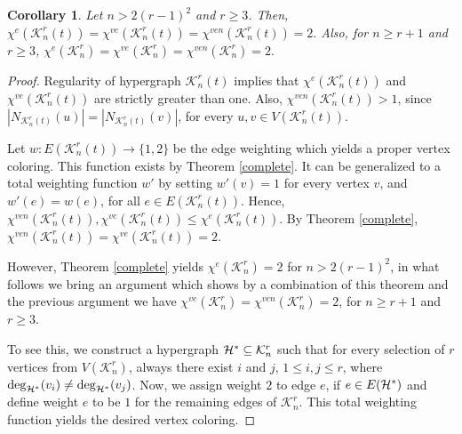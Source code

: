 \documentclass[12pt,a4paper]{article}
\newtheorem{cor}[theorem]{\bf Corollary}
\begin{document}
\begin{cor}
	Let $ n>2(r-1)^2 $ and $r\geq 3$. Then, $ \chi^{e}(\mathcal{K}_n^r(t))=\chi^{ve}(\mathcal{K}_n^r(t))= \chi^{ven}(\mathcal{K}_n^r(t))=2. $ Also, for $n\geq r+1$ and $r\geq 3$,
	$ \chi^{e}(\mathcal{K}_n^r)= \chi^{ve}(\mathcal{K}_n^r)=\chi^{ven}(\mathcal{K}_n^r)=2. $
\end{cor}
\begin{proof}
	Regularity of hypergraph $ \mathcal{K}_n^r(t) $ implies that $ \chi^{e}(\mathcal{K}_n^r(t))$ and $ \chi^{ve}(\mathcal{K}_n^r(t))$ are strictly greater than one. Also, $ \chi^{ven}(\mathcal{K}_n^r(t))> 1$, since $ |N_{\mathcal{K}_n^r(t)}(u)|=|N_{\mathcal{K}_n^r(t)}(v)|$, for every $ u, v \in V({\mathcal{K}_n^r(t)}) $.
	
	Let  $ w: E(\mathcal{K}_n^r(t))\rightarrow \{1,2\} $ be the edge weighting which yields a proper vertex coloring. This function exists by Theorem \ref{complete}. It can be generalized to a total weighting function $ w'$ by setting  $w'(v)=1$ for every vertex $v$, and $w'(e)=w(e)$, for all $ e\in E({\mathcal{K}_n^r(t)}) $.
	Hence,  $ \chi^{ven}({\mathcal{K}_n^r(t)}),\chi^{ve}({\mathcal{K}_n^r(t)})\leq\chi^{e}({\mathcal{K}_n^r(t)}) $. By Theorem \ref{complete}, $\chi^{ven}({\mathcal{K}_n^r(t)})=\chi^{ve}({\mathcal{K}_n^r(t)})=2 $.
	
	
	However, Theorem \ref{complete} yields $ \chi^{e}(\mathcal{K}_n^r)=2 $ for $ n>2(r-1)^2 $, in what follows we bring an argument which shows by a combination of this theorem and the previous argument we have $ \chi^{ve}({\mathcal{K}_n^r})=\chi^{ven}({\mathcal{K}_n^r})=2$, for $ n\geq r+1 $ and $ r\geq 3 $.
	
	To see this, we construct a hypergraph $ {\cal H}^*\subseteq{\mathcal{K}_n^r} $ such that for every selection of $ r $ vertices from $ V({\mathcal{K}_n^r}) $, always there exist $ i $ and $ j $, $ 1\leq i,j\leq r $, where $ \deg_{{\cal H}^*}(v_i)\neq\deg_{{\cal H}^*}(v_j) $. Now, we assign weight $ 2 $ to edge $ e $, if $ e\in E({\cal H}^*) $ and define weight $ e $ to be $ 1 $ for the remaining edges of $ \mathcal{K}_n^r $. This total weighting function yields the desired vertex coloring.
	

\end{proof}
\end{document}
